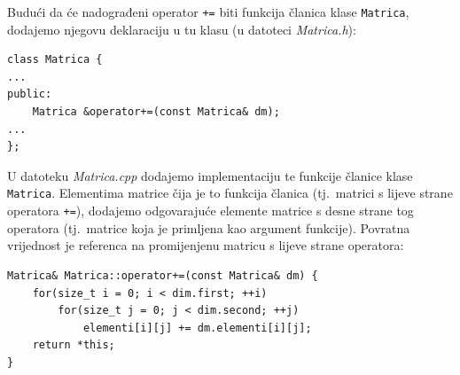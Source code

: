 \begin{rjesenje}
    Budući da će nadograđeni operator \texttt{+=} biti funkcija članica klase \texttt{Matrica},
    dodajemo njegovu deklaraciju u tu klasu
    (u datoteci \textit{Matrica.h}):
    \begin{verbatim}
class Matrica {
...
public:
    Matrica &operator+=(const Matrica& dm);
...
};
    \end{verbatim}
    U datoteku \textit{Matrica.cpp} dodajemo implementaciju te funkcije članice klase \texttt{Matrica}.
    Elementima matrice čija je to funkcija članica (tj.\ 
    matrici s lijeve strane operatora \texttt{+=}),
    dodajemo odgovarajuće elemente matrice s desne strane tog operatora
    (tj.\ matrice koja je primljena kao argument funkcije).
    Povratna vrijednost je referenca na promijenjenu matricu s lijeve strane operatora:
    \begin{verbatim}
Matrica& Matrica::operator+=(const Matrica& dm) {
    for(size_t i = 0; i < dim.first; ++i)
        for(size_t j = 0; j < dim.second; ++j)
            elementi[i][j] += dm.elementi[i][j];
    return *this;
}
    \end{verbatim}
\end{rjesenje}



